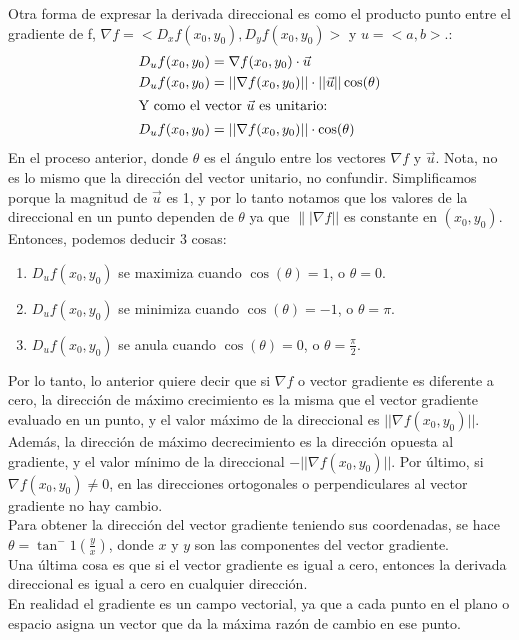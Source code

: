 \documentclass[12pt, letterpaper]{report}
\begin{document}
Otra forma de expresar la derivada direccional es como el producto punto entre el gradiente de f, $\nabla f = <D_xf(x_0, y_0), D_yf(x_0, y_0)>$ y $u = <a, b>$.: 
\begin{align}
D_uf(x_0, y_0) &= \nabla f(x_0, y_0) \cdot \vec{u}\\
D_uf(x_0, y_0) &= ||\nabla f(x_0, y_0)|| \cdot ||\vec{u}|| \cos(\theta)\\
\intertext{Y como el vector $\vec{u}$ es unitario:}
D_uf(x_0, y_0) &= ||\nabla f (x_0, y_0) || \cdot \cos(\theta)
\end{align}
En el proceso anterior, donde $\theta$ es el ángulo entre los vectores $\nabla f$ y $\vec{u}$. Nota, no es lo mismo que la 
dirección del vector unitario, no confundir. Simplificamos porque la magnitud de $\vec{u}$ es 1, y por lo tanto notamos que 
los valores de la direccional en un punto dependen de $\theta$ ya que $\||\nabla f||$ es constante en $(x_0, y_0)$. Entonces, podemos deducir 3 cosas: 
\begin{enumerate}
\item $D_uf(x_0, y_0)$ se maximiza cuando $\cos(\theta) = 1$, o $\theta = 0$. 
\item $D_uf(x_0, y_0)$ se minimiza cuando $\cos(\theta) = -1$, o $\theta = \pi$. 
\item $D_uf(x_0, y_0)$ se anula cuando $\cos(\theta) = 0$, o $\theta = \frac{\pi}{2}$. 
\end{enumerate}
Por lo tanto, lo anterior quiere decir que si $\nabla f$ o vector gradiente es diferente a cero, la dirección de máximo crecimiento es la misma 
que el vector gradiente evaluado en un punto, y el valor máximo de la direccional es $||\nabla f(x_0, y_0)||$. Además, la dirección de máximo decrecimiento es 
la dirección opuesta al gradiente, y el valor mínimo de la direccional $-||\nabla f(x_0, y_0)||$. Por último, si $\nabla f(x_0, y_0) \neq 0$, en las direcciones ortogonales 
o perpendiculares al vector gradiente no hay cambio. \\

Para obtener la dirección del vector gradiente teniendo sus coordenadas, se hace $\theta = \tan^-1(\frac{y}{x})$, donde $x$ y $y$ son las componentes del vector 
gradiente.\\

Una última cosa es que si el vector gradiente es igual a cero, entonces la derivada direccional es igual a cero en cualquier dirección. \\ 

En realidad el gradiente es un campo vectorial, ya que a cada punto en el plano o espacio asigna un vector que da la máxima razón de cambio en ese punto. 
\end{document}
